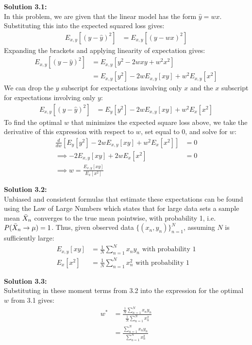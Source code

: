 \documentclass[submit]{harvardml}
\begin{document}
\newpage

\noindent\textbf{Solution 3.1:}\\
In this problem, we are given that the linear model has the form $\hat{y} = wx$. Substituting this into the expected squared loss gives:
\begin{align*}
    E_{x,y}[ ( y - \hat{y} )^2] &= E_{x,y}[ ( y - wx )^2]   
\end{align*}
Expanding the brackets and applying linearity of expectation gives:
\begin{align*}
    E_{x,y}[ ( y - \hat{y} )^2] &= E_{x,y}[ y^2 - 2wxy + w^2 x^2]\\
    &= E_{x,y}[ y^2 ] - 2wE_{x,y}[xy] + w^2 E_{x,y}[x^2]
\end{align*}
We can drop the $y$ subscript for expectations involving only $x$ and the $x$ subscript for expectations involving only $y$:
\begin{align*}
    E_{x,y}[ ( y - \hat{y} )^2] &= E_{y}[ y^2 ] - 2wE_{x,y}[xy] + w^2 E_{x}[x^2]
\end{align*}
To find the optimal $w$ that minimizes the expected square loss above, we take the derivative of this expression with respect to $w$, set equal to 0, and solve for $w$:
\begin{align*}
    \frac{d}{dw} [ E_{y}[ y^2 ] - 2wE_{x,y}[xy] + w^2 E_{x}[x^2] ] &= 0\\
    \implies - 2E_{x,y}[xy] + 2w E_{x}[x^2] &= 0\\
    \implies w = \frac{E_{x,y}[xy]}{E_{x}[x^2]}
\end{align*}

\bigskip
\noindent\textbf{Solution 3.2:}\\
Unbiased and consistent formulas that estimate these expectations can be found using the Law of Large Numbers which states that for large data sets a sample mean $\Bar{X}_n$ converges to the true mean pointwise, with probability 1, i.e. $P(\Bar{X}_n \rightarrow \mu) = 1$. Thus, given observed data $\{(x_n,y_n)\}_{n=1}^N$, assuming $N$ is sufficiently large:
\begin{align*}
    E_{x,y}[xy] &= \frac{1}{N} \sum_{n=1}^{N} x_n y_n \text{ with probability } 1\\
    E_{x}[x^2] &= \frac{1}{N} \sum_{n=1}^{N} x_n^2 \text{ with probability } 1
\end{align*}

\bigskip
\noindent\textbf{Solution 3.3:}\\
Substituting in these moment terms from 3.2 into the expression for the optimal $w$ from 3.1 gives:
\begin{align*}
    w^* &= \frac{\frac{1}{N} \sum_{n=1}^{N} x_n y_n}{\frac{1}{N} \sum_{n=1}^{N} x_n^2}\\
    &= \frac{\sum_{n=1}^{N} x_n y_n}{\sum_{n=1}^{N} x_n^2}
\end{align*}
\end{document}
